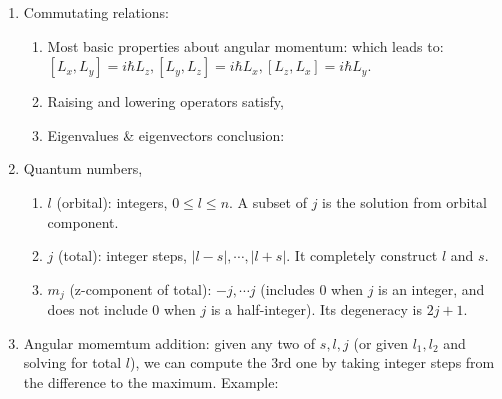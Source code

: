 \documentclass{school-22.101-notes}
\begin{document}
\begin{enumerate}
\item Commutating relations: 
  \begin{enumerate}
  \item Most basic properties about angular momentum:
    which leads to: $[L_x, L_y] = i \hbar L_z, [L_y, L_z] = i \hbar L_x, [L_z, L_x] = i \hbar L_y$. 

  \item Raising and lowering operators satisfy,

  \item Eigenvalues \& eigenvectors conclusion: 
  \end{enumerate}

\item Quantum numbers, 
  \begin{enumerate}
  \item $l$ (orbital): integers, $0 \le l \le n$. A subset of $j$ is the solution from orbital component. 
  \item $j$ (total): integer steps, $|l-s|, \cdots, |l+s|$. It completely construct $l$ and $s$. 
  \item $m_j$ (z-component of total): $-j, \cdots j$ (includes 0 when $j$ is an integer, and does not include 0 when $j$ is a half-integer). Its degeneracy is $2j+1$. 
  \end{enumerate}

\item Angular momemtum addition: given any two of $s, l, j$ (or given $l_1, l_2$ and solving for total $l$), we can compute the 3rd one by taking integer steps from the difference to the maximum. Example: 
\end{enumerate}
\end{document}
